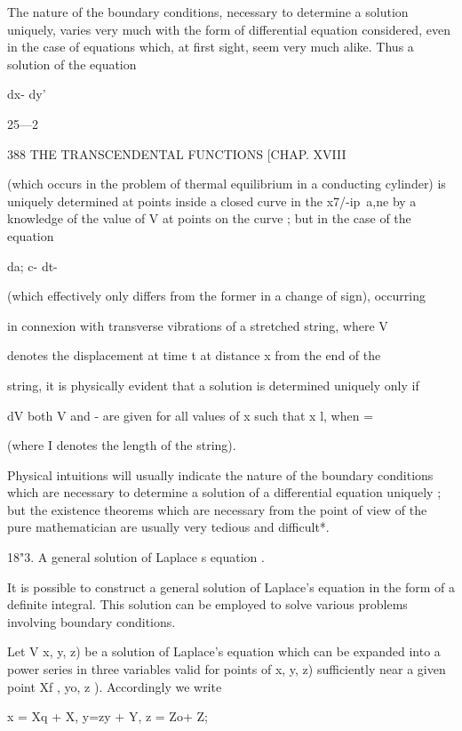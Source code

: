 The nature of the boundary conditions, necessary to determine a solution 
uniquely, varies very much with the form of differential equation considered, 
even in the case of equations which, at first sight, seem very much alike. 
Thus a solution of the equation 



dx- dy'  



25—2 



388 THE TRANSCENDENTAL FUNCTIONS [CHAP. XVIII 

(which occurs in the problem of thermal equilibrium in a conducting 
cylinder) is uniquely determined at points inside a closed curve in the 
x7/-ip\ a,ne by a knowledge of the value of V at points on the curve ; but 
in the case of the equation 

da;  c- dt- 

(which effectively only differs from the former in a change of sign), occurring 

in connexion with transverse vibrations of a stretched string, where V 

denotes the displacement at time t at distance x from the end of the 

string, it is physically evident that a solution is determined uniquely only if 

dV 
both V and -  are given for all values of x such that  x l, when   = 

(where I denotes the length of the string). 

Physical intuitions will usually indicate the nature of the boundary 
conditions which are necessary to determine a solution of a differential 
equation uniquely ; but the existence theorems which are necessary from 
the point of view of the pure mathematician are usually very tedious and 
difficult*. 

18"3. A general solution of Laplace s equation . 

It is possible to construct a general solution of Laplace's equation in the 
form of a definite integral. This solution can be employed to solve various 
problems involving boundary conditions. 

Let V  x, y, z) be a solution of Laplace's equation which can be expanded 
into a power series in three variables valid for points of  x, y, z) sufficiently 
near a given point  Xf , yo, z ). Accordingly we write 

x = Xq + X, y=zy  + Y, z = Zo+ Z; 

